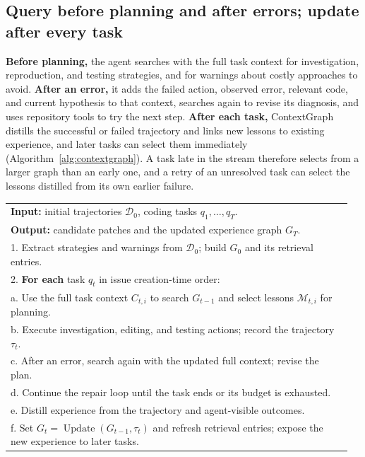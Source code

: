 \subsection{Query before planning and after errors; update after every task}
\label{sec:experience-access}
\textbf{Before planning,} the agent searches with the full task context for
investigation, reproduction, and testing strategies, and for warnings about
costly approaches to avoid.
\textbf{After an error,} it adds the failed action, observed error, relevant
code, and current hypothesis to that context, searches again to revise its
diagnosis, and uses repository tools to try the next step.
\textbf{After each task,} ContextGraph distills the successful or failed
trajectory and links new lessons to existing experience, and later tasks can
select them immediately (Algorithm~\ref{alg:contextgraph}). A task late in the stream
therefore selects from a larger graph than an early one, and a retry of an
unresolved task can select the lessons distilled from its own earlier failure.

\begin{algorithm}[t]
\caption{ContextGraph across a stream of coding tasks}
\label{alg:contextgraph}
\small
\begin{tabular}{@{}p{0.96\linewidth}@{}}
\textbf{Input:} initial trajectories $\mathcal D_0$, coding tasks $q_1,\ldots,q_T$.\\
\textbf{Output:} candidate patches and the updated experience graph $G_T$.\\
1. Extract strategies and warnings from $\mathcal D_0$; build $G_0$ and its retrieval entries.\\
2. \textbf{For each} task $q_t$ in issue creation-time order:\\
\quad a. Use the full task context $C_{t,i}$ to search $G_{t-1}$ and select lessons $\mathcal M_{t,i}$ for planning.\\
\quad b. Execute investigation, editing, and testing actions; record the trajectory $\tau_t$.\\
\quad c. After an error, search again with the updated full context; revise the plan.\\
\quad d. Continue the repair loop until the task ends or its budget is exhausted.\\
\quad e. Distill experience from the trajectory and agent-visible outcomes.\\
\quad f. Set $G_t=\operatorname{Update}(G_{t-1},\tau_t)$ and refresh retrieval entries; expose the new experience to later tasks.\\
\end{tabular}
\end{algorithm}
